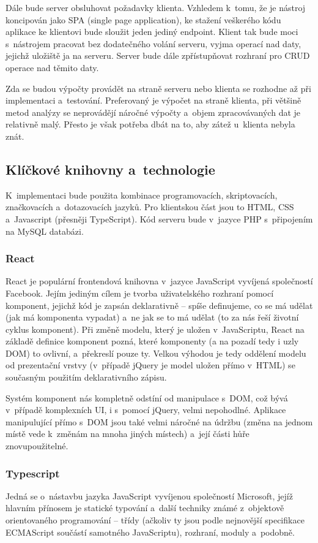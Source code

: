 Dále bude server obsluhovat požadavky klienta. Vzhledem k~tomu, že je nástroj koncipován jako SPA (single page application), ke stažení veškerého kódu aplikace ke klientovi bude sloužit jeden jediný endpoint. Klient tak bude moci s~nástrojem pracovat bez dodatečného volání serveru, vyjma operací nad daty, jejichž uložiště ja na serveru. Server bude dále zpřístupňovat rozhraní pro CRUD operace nad těmito daty.

Zda se budou výpočty provádět na straně serveru nebo klienta se rozhodne až při implementaci a~testování. Preferovaný je výpočet na straně klienta, při většině metod analýzy se neprovádějí náročné výpočty a~objem zpracovávaných dat je relativně malý. Přesto je však potřeba dbát na to, aby zátež u~klienta nebyla znát. 



\subsection{Klíčkové knihovny a~technologie}
K~implementaci bude použita kombinace programovacích, skriptovacích, značkovacích a~dotazovacích jazyků. Pro klientskou část jsou to HTML, CSS a~Javascript (přesněji TypeScript). Kód serveru bude v~jazyce PHP s~připojením na MySQL databázi.


\subsubsection{React}
React je populární frontendová knihovna v~jazyce JavaScript vyvíjená společností Facebook. Jejím jediným cílem je tvorba uživatelského rozhraní pomocí komponent, jejichž kód je zapsán deklarativně -- spíše definujeme, co se má udělat (jak má komponenta vypadat) a~ne jak se to má udělat (to za nás řeší životní cyklus komponent). Při změně modelu, který je uložen v~JavaScriptu, React na základě definice komponent pozná, které komponenty (a na pozadí tedy i uzly DOM) to ovlivní, a~překreslí pouze ty. Velkou výhodou je tedy oddělení modelu od prezentační vrstvy (v~případě jQuery je model uložen přímo v~HTML) se současným použitím deklarativního zápisu.

Systém komponent nás kompletně odstíní od manipulace s~DOM, což bývá v~případě komplexních UI, i s~pomocí jQuery, velmi nepohodlné. Aplikace manipulující přímo s~DOM jsou také velmi náročné na údržbu (změna na jednom místě vede k~změnám na mnoha jiných místech) a~její části hůře znovupoužitelné.


\subsubsection{Typescript}
Jedná se o~nástavbu jazyka JavaScript vyvíjenou společností Microsoft, jejíž hlavním přínosem je statické typování a~další techniky známé z~objektově orientovaného programování -- třídy (ačkoliv ty jsou podle nejnovější specifikace ECMAScript součástí samotného JavaScriptu), rozhraní, moduly a~podobně.

